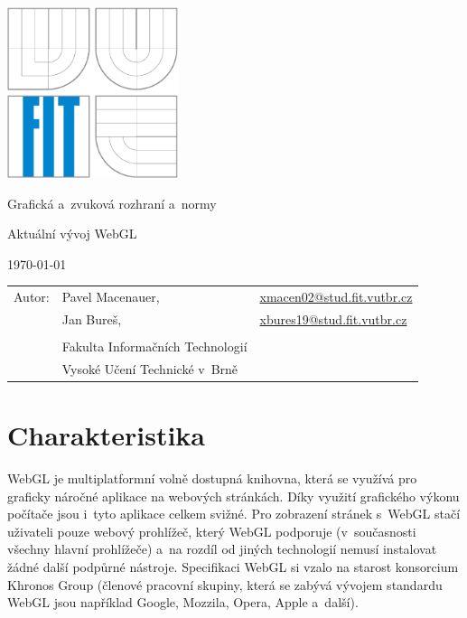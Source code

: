 \documentclass[12pt,a4paper,titlepage,final]{report}
\makeatletter
\newcommand\Course{	Grafická a~zvuková rozhraní a~normy}
\newcommand\WorkTitle{Aktuální vývoj WebGL}
\newcommand\AuthorA{Pavel Macenauer}
\newcommand\AuthorB{Jan Bureš}
\newcommand\AuthorAEmail{xmacen02@stud.fit.vutbr.cz}
\newcommand\AuthorBEmail{xbures19@stud.fit.vutbr.cz}
\newcommand\Faculty{Fakulta Informačních Technologií}
\newcommand\School{Vysoké Učení Technické v~Brně}
\makeatother
\begin{document}
	\begin{titlepage}
	\begin{center}
		\includegraphics[height=5cm]{images/logo.eps}
	\end{center}
	\vfill
	\begin{center}
		\begin{Large}
			\Course\\
		\end{Large}
		\bigskip
		\begin{Huge}
			\WorkTitle\\
		\end{Huge}
	\end{center}
	\vfill
	\begin{center}
		\begin{large}
			\today
		\end{large}
	\end{center}
	\vfill
	\begin{flushleft}
		\begin{large}
			\begin{tabular}{lll}
				Autor: & \AuthorA, & \url{\AuthorAEmail} \\
				& \AuthorB, & \url{\AuthorBEmail} \\
		
				& & \\
				& \Faculty \\
				& \School \\
			\end{tabular}
		\end{large}
	\end{flushleft}
\end{titlepage}		



\newpage

\section{Charakteristika}
WebGL je multiplatformní volně dostupná knihovna, která se využívá pro graficky náročné aplikace na webových stránkách. Díky využití grafického výkonu počítače jsou i~tyto aplikace celkem svižné. Pro zobrazení stránek s~WebGL stačí uživateli pouze webový prohlížeč, který WebGL podporuje (v~současnosti všechny hlavní prohlížeče) a~na rozdíl od jiných technologií nemusí instalovat žádné další podpůrné nástroje. Specifikaci WebGL si vzalo na starost konsorcium Khronos Group (členové pracovní skupiny, která se zabývá vývojem standardu WebGL jsou například Google, Mozzila, Opera, Apple a~další).      
\end{document}
